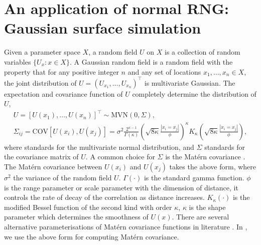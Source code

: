 \documentclass[article,nojss]{jss}\usepackage[]{graphicx}\usepackage[]{color}
\def\cov{{\text{COV}}}
\begin{document}
\section{An application of normal RNG: Gaussian surface simulation} 
Given a parameter space $X$, a random field $U$ on $X$ is a collection of random variables $\{U_x :x\in X\}$. A Gaussian random field is a random field with the property that for any positive integer $n$ and any set of locations $x_1,\dots,x_n \in X$, the joint distribution of $U=(U_{x_1},\dots,U_{x_n})^\top$ is multivariate Gaussian. The expectation and covariance function of $U$ completely determine the distribution of $U$, 
\begin{gather*} 
U = [U(x_1), \ldots, U(x_n)]^\top \sim \text{MVN}(0, \Sigma), \\
\Sigma_{ij} = \cov[ U(x_i),U(x_j) ] = \sigma^2 \frac{2^{\kappa-1}}{\Gamma(\kappa)} \left(\sqrt{8\kappa} \frac{|x_i = x_j|}{\phi}\right)^\kappa  K_\kappa\left(\sqrt{8\kappa}  \frac{|x_i = x_j|}{\phi}\right),
\end{gather*}
where  standards for the multivariate normal distribution, and $\Sigma$ standards for the covariance matrix of $U$. A common choice for $\Sigma$ is the Mat\'ern covariance \citep{matern1960spatial}. The Mat\'ern covariance between $U(x_i)$ and $U(x_j)$ takes the above form,
where $\sigma^2$ the variance of the random field $U$.
$\Gamma(\cdot)$ is the standard gamma function.  
$\phi$ is the range parameter or scale parameter with the dimension of distance, it controls the rate of decay of the correlation as distance increases. $K_\kappa(\cdot)$ is the modified Bessel function of the second kind with order $\kappa$, $\kappa$ is the shape parameter which determines the smoothness of $U(x)$. %
There are several alternative parameterisations of Mat\'ern covariance functions in literature  \citep[see][]{haskard2007anisotropic}. In , we use the above form for computing Mat\'ern covariance.
\end{document}
